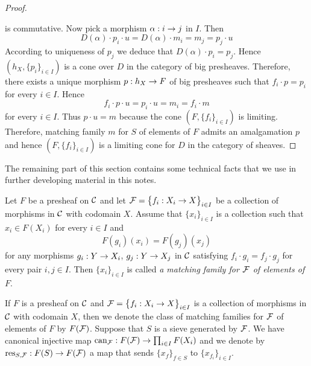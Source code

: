 \begin{proof}
\begin{center}
\end{center}
is commutative. Now pick a morphism $\alpha:i\rightarrow j$ in $I$. Then 
$$D(\alpha)\cdot p_i\cdot u = D(\alpha)\cdot m_i = m_j = p_j\cdot u$$
According to uniqueness of $p_j$ we deduce that $D(\alpha)\cdot p_i = p_j$. Hence $\left(h_X,\big\{p_i\big\}_{i\in I}\right)$ is a cone over $D$ in the category of big presheaves. Therefore, there exists a unique morphism $p:h_X\rightarrow F$ of big presheaves such that $f_i\cdot p = p_i$ for every $i\in I$. Hence 
$$f_i\cdot p\cdot u=p_i\cdot u= m_i = f_i\cdot m$$
for every $i\in I$. Thus $p\cdot u = m$ because the cone $\left(F,\big\{f_i\big\}_{i\in I}\right)$ is limiting. Therefore, matching family $m$ for $S$ of elements of $F$ admits an amalgamation $p$ and hence $\left(F,\big\{f_i\big\}_{i\in I}\right)$ is a limiting cone for $D$ in the category of sheaves. 
\end{proof}
\noindent
The remaining part of this section contains some technical facts that we use in further developing material in this notes.

\begin{definition}
Let $F$ be a presheaf on ${\mathcal C}$ and let ${\mathcal F} = \big\{f_i:X_i\rightarrow X\big\}_{i\in I}$ be a collection of morphisms in ${\mathcal C}$ with codomain $X$. Assume that $\{x_i\}_{i\in I}$ is a collection such that $x_i\in F(X_i)$ for every $i\in I$ and
$$F(g_i)(x_i) = F(g_j)(x_j)$$
for any morphisms $g_i:Y\rightarrow X_i$, $g_j:Y\rightarrow X_j$ in ${\mathcal C}$ satisfying $f_i\cdot g_i = f_j\cdot g_j$ for every pair $i,j\in I$. Then $\{x_i\}_{i\in I}$ is called \textit{a matching family for ${\mathcal F}$ of elements of $F$}.
\end{definition}
\noindent
If $F$ is a presheaf on ${\mathcal C}$ and ${\mathcal F} = \big\{f_i:X_i\rightarrow X\big\}_{i\in I}$ is a collection of morphisms in ${\mathcal C}$ with codomain $X$, then we denote the class of matching families for ${\mathcal F}$ of elements of $F$ by $F({\mathcal F})$. Suppose that $S$ is a sieve generated by ${\mathcal F}$. We have canonical injective map $\mathrm{can}_{{\mathcal F}}:F({\mathcal F})\rightarrow \prod_{i\in I}F(X_i)$ and we denote by $\mathrm{res}_{S,{\mathcal F}}:F(S)\rightarrow F({\mathcal F})$ a map that sends $\{x_f\}_{f\in S}$ to $\{x_{f_i}\}_{i\in I}$.

